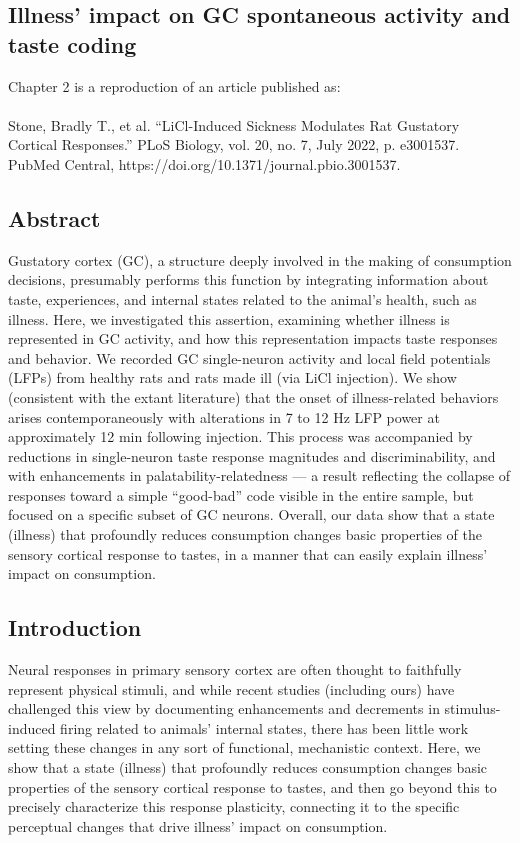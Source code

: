 \begin{refsection}

\chapter[Illness and Taste Processing]{Illness’ impact on GC spontaneous activity and taste coding}

Chapter 2 is a reproduction of an article published as:\\\\
Stone, Bradly T., et al. “LiCl-Induced Sickness Modulates Rat Gustatory Cortical Responses.” PLoS Biology, vol. 20, no. 7, July 2022, p. e3001537. PubMed Central, https://doi.org/10.1371/journal.pbio.3001537.

\section{Abstract}
Gustatory cortex (GC), a structure deeply involved in the making of consumption decisions, presumably performs this function by integrating information about taste, experiences, and internal states related to the animal’s health, such as illness. Here, we investigated this assertion, examining whether illness is represented in GC activity, and how this representation impacts taste responses and behavior. We recorded GC single-neuron activity and local field potentials (LFPs) from healthy rats and rats made ill (via LiCl injection). We show (consistent with the extant literature) that the onset of illness-related behaviors arises contemporaneously with alterations in 7 to 12 Hz LFP power at approximately 12 min following injection. This process was accompanied by reductions in single-neuron taste response magnitudes and discriminability, and with enhancements in palatability-relatedness --- a result reflecting the collapse of responses toward a simple “good-bad” code visible in the entire sample, but focused on a specific subset of GC neurons. Overall, our data show that a state (illness) that profoundly reduces consumption changes basic properties of the sensory cortical response to tastes, in a manner that can easily explain illness’ impact on consumption.

\section{Introduction}
Neural responses in primary sensory cortex are often thought to faithfully represent physical stimuli, and while recent studies (including ours) have challenged this view by documenting enhancements and decrements in stimulus-induced firing related to animals’ internal states, there has been little work setting these changes in any sort of functional, mechanistic context. Here, we show that a state (illness) that profoundly reduces consumption changes basic properties of the sensory cortical response to tastes, and then go beyond this to precisely characterize this response plasticity, connecting it to the specific perceptual changes that drive illness’ impact on consumption.


\end{refsection}
